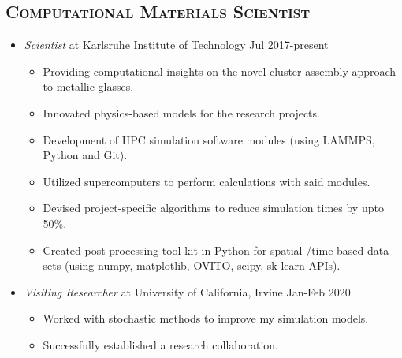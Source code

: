 
\subsection*{\textsc{Computational Materials Scientist}}
\begin{itemize}[noitemsep]
 \item \emph{Scientist} at Karlsruhe Institute of Technology \hfill{Jul 2017-present}
\begin{itemize}[topsep=0pt] \setlength\itemsep{-0.1cm}
	\item Providing computational insights on the novel cluster-assembly approach to metallic glasses.
	\item Innovated physics-based models for the research projects.
	\item Development of HPC simulation software modules (using LAMMPS, Python and Git).
	\item Utilized supercomputers to perform  calculations with said modules.
	\item Devised project-specific algorithms to reduce simulation times by upto 50\%.
	\item Created post-processing tool-kit in Python for spatial-/time-based data sets (using numpy, matplotlib, OVITO, scipy, sk-learn APIs).
\end{itemize}
\item \emph{Visiting Researcher} at University of California, Irvine \hfill{Jan-Feb 2020}
\begin{itemize}[topsep=0pt]  \setlength\itemsep{-0.1cm}
\item Worked with stochastic methods to improve my simulation models. %
\item Successfully established a research collaboration. 
\end{itemize}

\end{itemize}

